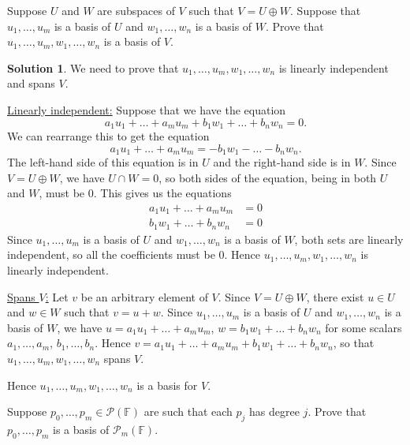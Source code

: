 \documentclass[12pt]{article}
\theoremstyle{definition}
\theoremstyle{definition}
\newtheorem*{soln}{Solution}
\newcommand{\F}{\mathbb{F}}
\begin{document}
\begin{prob}[Axler 2.B.8] Suppose $U$ and $W$ are subspaces of $V$ such that $V=U\oplus W$.  Suppose that $u_1,\dots,u_m$ is a basis of $U$ and $w_1,\dots,w_n$ is a basis of $W$. Prove that $u_1,\dots,u_m,w_1,\dots,w_n$ is a basis of $V$.
\end{prob}

\begin{soln}
We need to prove that $u_1,\dots,u_m,w_1,\dots,w_n$ is linearly independent and spans $V$.

\underline{Linearly independent:}
Suppose that we have the equation
\[a_1u_1+\dots+a_mu_m+b_1w_1+\dots+b_nw_n=0.\]
We can rearrange this to get the equation
\[a_1u_1+\dots+a_mu_m=-b_1w_1-\dots-b_nw_n.\]
The left-hand side of this equation is in $U$ and the right-hand side is in $W$. Since $V=U\oplus W$, we have $U\cap W=0$, so both sides of the equation, being in both $U$ and $W$, must be $0$. This gives us the equations
\begin{align*}
a_1u_1+\dots+a_mu_m &= 0 \\
b_1w_1+\dots+b_nw_n &=0
\end{align*}
Since $u_1,\dots,u_m$ is a basis of $U$ and $w_1,\dots,w_n$ is a basis of $W$, both sets are linearly independent, so all the coefficients must be $0$. Hence $u_1,\dots,u_m,w_1,\dots,w_n$ is linearly independent.

\underline{Spans $V$:}
Let $v$ be an arbitrary element of $V$. Since $V=U\oplus W$, there exist $u\in U$ and $w\in W$ such that $v=u+w$. Since $u_1,\dots,u_m$ is a basis of $U$ and $w_1,\dots,w_n$ is a basis of $W$, we have $u=a_1u_1+\dots+a_mu_m$, $w=b_1w_1+\dots+b_nw_n$ for some scalars $a_1,\dots,a_m$, $b_1,\dots,b_n$. Hence $v=a_1u_1+\dots+a_mu_m+b_1w_1+\dots+b_nw_n$, so that $u_1,\dots,u_m,w_1,\dots,w_n$ spans $V$.

Hence $u_1,\dots,u_m,w_1,\dots,w_n$ is a basis for $V$.
\end{soln}

\begin{prob}[Axler 2.C.10]
Suppose $p_0,\dots,p_m\in\mathcal{P}(\F)$ are such that each $p_j$ has degree $j$. Prove that $p_0,\dots,p_m$ is a basis of $\mathcal{P}_m(\F)$.
\end{prob}
\end{document}
